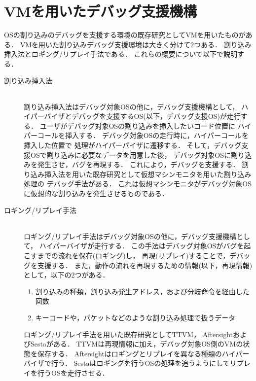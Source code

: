 \documentclass[tanilab-enum]{graduate}
\begin{document}
\section{VMを用いたデバッグ支援機構}
OSの割り込みのデバッグを支援する環境の既存研究としてVMを用いたものがある．
VMを用いた割り込みデバッグ支援環境は大きく分けて2つある．
割り込み挿入法\cite{miyahara}とロギング/リプレイ手法\cite{samuel}\cite{jim}\cite{kawasaki}である．
これらの概要について以下で説明する．
\begin{description}
    \item[割り込み挿入法]\mbox{}\\
        割り込み挿入法はデバッグ対象OSの他に，デバッグ支援機構として，
        ハイパーバイザとデバッグを支援するOS(以下，デバッグ支援OS)が走行する．
        ユーザがデバッグ対象OSの割り込みを挿入したいコード位置に
        ハイパーコールを挿入する．
        デバッグ対象OSの走行時に，ハイパーコールを挿入した位置で
        処理がハイパーバイザに遷移する．
        そして，デバッグ支援OSで割り込みに必要なデータを用意した後，
        デバッグ対象OSに割り込みを発生させ，バグを再現する．
        これにより，デバッグを支援する．
        割り込み挿入法を用いた既存研究として仮想マシンモニタを用いた割り込み処理の
        デバッグ手法\cite{miyahara}がある．
        これは仮想マシンモニタがデバッグ対象OSに仮想的な割り込みを発生させるものである．
    \item[ロギング/リプレイ手法]\mbox{}\\
        ロギング/リプレイ手法はデバッグ対象OSの他に，デバッグ支援機構として，
        ハイパーバイザが走行する．
        この手法はデバッグ対象OSがバグを起こすまでの流れを保存(ロギング)し，
        再現(リプレイ)することで，デバッグを支援する．
        また，動作の流れを再現するための情報(以下，再現情報)として，以下の2つがある．
        \begin{enumerate}
            \item 割り込みの種類，割り込み発生アドレス，および分岐命令を経由した回数\\
            \item キーコードや，パケットなどのような割り込み処理で扱うデータ
        \end{enumerate}
        ロギング/リプレイ手法を用いた既存研究としてTTVM\cite{samuel}，
        Aftersight\cite{jim}およびSesta\cite{kawasaki}がある．
        TTVMは再現情報に加え，デバッグ対象OS側のVMの状態を保存する．
        Aftersightはロギングとリプレイを異なる種類のハイパーバイザで行う．
        Sestaはロギングを行うOSの処理を追うようにしてリプレイを行うOSを走行させる．

\end{description}
\end{document}
